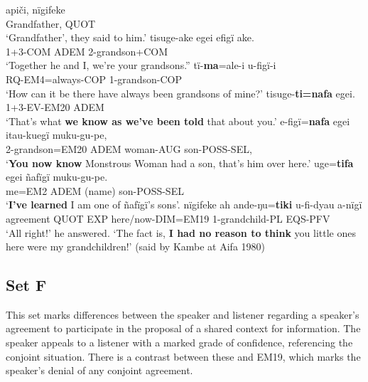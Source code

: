 \documentclass[output=paper]{langsci/langscibook}
\begin{document}
\begin{exe}
\ex \label{ex:eb49}
	\begin{xlist}
	\ex \label{ex:eb49a}
	\gll apiči, nïgifeke\\
	Grandfather, QUOT\\
	\trans ‘Grandfather’, they said to him.’
	\ex \label{ex:eb49b}
	\gll tisuge-ake egei efigï ake.\\
	1+3-COM ADEM 2-grandson+COM\\
	\trans ‘Together  he and I, we’re your grandsons.”
	\ex \label{ex:eb49c}
	\gll tï-\textbf{ma}=ale-i u-figï-i\\
	RQ-EM4=always-COP 1-grandson-COP\\
	\trans ‘How can it be there have always been grandsons of mine?’
	\ex \label{ex:eb49d}
	\gll tisuge-\textbf{ti=nafa} egei.\\
	1+3-EV-EM20 ADEM\\
	\trans ‘That’s what \textbf{we know as we’ve been told} that about you.’
	\ex \label{ex:eb49e}
	\gll e-figï=\textbf{nafa} egei itau-kuegï muku-gu-pe,\\
	2-grandson=EM20 ADEM woman-AUG son-POSS-SEL,\\
	\trans ‘\textbf{You now know} Monstrous Woman had a son, that’s him over here.’
	\ex \label{ex:eb49f}
	\gll uge=\textbf{tifa} egei ñafïgï muku-gu-pe.\\
	me=EM2 ADEM (name) son-POSS-SEL\\
	\trans ‘\textbf{I’ve learned} I am one of ñafïgï’s sons’.
	\ex \label{ex:eb49g}
	 nïgifeke ah ande-ŋu=\textbf{tiki} u-fi-dyau a-nïgï\\
	agreement QUOT EXP here/now-DIM=EM19 1-grandchild-PL EQS-PFV\\
	\trans ‘All right!’ he answered. ‘The fact is, \textbf{I had no reason to think} you little ones here were my grandchildren!’ (said by Kambe at Aifa 1980)
\end{xlist}
\end{exe}


\subsection{Set F}

This set marks differences between the speaker and listener regarding a speaker’s agreement to participate in the proposal of a shared context for information.   The speaker appeals to a listener with a marked grade of confidence,  referencing the conjoint situation.  There is a contrast between these and EM19, which marks the speaker’s denial of any conjoint agreement.
\end{document}

